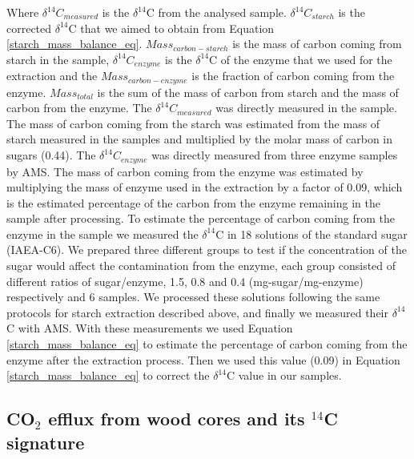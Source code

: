 \documentclass{article}
\begin{document}
Where $\delta^{14}C_{measured}$ is the $\delta^{14}$C from the analysed sample. $\delta^{14}C_{starch}$ is the corrected $\delta^{14}$C that we aimed to obtain from Equation \ref{starch_mass_balance_eq}. $Mass_{carbon-starch}$ is the mass of carbon coming from starch in the sample, $\delta^{14}C_{enzyme}$ is the $\delta^{14}$C of the enzyme that we used for the extraction and the $Mass_{carbon-enzyme}$ is the fraction of carbon coming from the enzyme. $Mass_{total}$ is the sum of the mass of carbon from starch and the mass of carbon from the enzyme. The $\delta^{14}C_{measured}$ was directly measured in the sample. The mass of carbon coming from the starch was estimated from the mass of starch measured in the samples and multiplied by the molar mass of carbon in sugars (0.44). The $\delta^{14}C_{enzyme}$ was directly measured from three enzyme samples by AMS. The mass of carbon coming from the enzyme was estimated by multiplying the mass of enzyme used in the extraction by a factor of 0.09, which is the estimated percentage of the carbon from the enzyme remaining in the sample after processing. To estimate the percentage of carbon coming from the enzyme in the sample we measured the $\delta^{14}$C in 18 solutions of the standard sugar (IAEA-C6). We prepared three different groups to test if the concentration of the sugar would affect the contamination from the enzyme, each group consisted of different ratios of sugar/enzyme, 1.5, 0.8 and 0.4 (mg-sugar/mg-enzyme) respectively and 6 samples. We processed these solutions following the same protocols for starch extraction described above, and finally we measured their $\delta^{14}$C with AMS. With these measurements we used Equation \ref{starch_mass_balance_eq} to estimate the percentage of carbon coming from the enzyme after the extraction process. Then we used this value (0.09) in Equation \ref{starch_mass_balance_eq} to correct the $\delta^{14}$C value in our samples. 

\subsection{CO$_{2}$ efflux from wood cores and its $^{14}$C signature}
\end{document}
